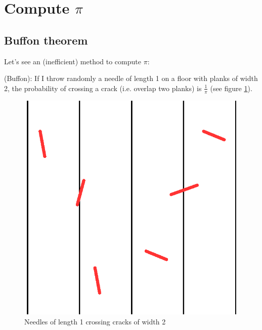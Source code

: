 \section[Compute \texorpdfstring{$\pi$}{pi}]{Compute $\pi$}

\subsection{Buffon theorem}

Let's see an (inefficient) method to compute $\pi$:

\begin{theorem} (Buffon): If I throw randomly a needle of length 1 on a floor with planks of width 2, the probability of crossing a crack (i.e. overlap two planks) is $\frac{1}{\pi}$ (see figure \ref{needles}).
\end{theorem}


\begin{figure}[h]
\centering
\includegraphics[scale=0.7]{images/needles.eps}
\caption{Needles of length 1 crossing cracks of width 2}
\label{needles}
\end{figure}

